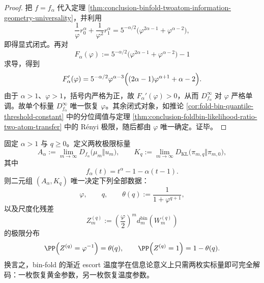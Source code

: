 \begin{proof}
把 \(f=f_\alpha\) 代入定理 \ref{thm:conclusion-binfold-twoatom-information-geometry-universality}，并利用
\[
\frac1\varphi r_0^\alpha+\frac1{\varphi^2}r_1^\alpha
=
5^{-\alpha/2}\bigl(\varphi^{2\alpha-1}+\varphi^{\alpha-2}\bigr),
\]
即得显式闭式。再对
\[
F_\alpha(\varphi):=5^{-\alpha/2}\bigl(\varphi^{2\alpha-1}+\varphi^{\alpha-2}\bigr)-1
\]
求导，得到
\[
F_\alpha'(\varphi)
=
5^{-\alpha/2}\varphi^{\alpha-3}
\Bigl((2\alpha-1)\varphi^{\alpha+1}+\alpha-2\Bigr).
\]
由于 \(\alpha>1\)、\(\varphi>1\)，括号内严格为正，故 \(F_\alpha'(\varphi)>0\)，从而 \(D_{f_\alpha}^\infty\) 对 \(\varphi\) 严格单调。故单个标量 \(D_{f_\alpha}^\infty\) 唯一恢复 \(\varphi\)。其余闭式对象，如推论 \ref{cor:fold-bin-quantile-threshold-constant} 中的分位阈值与定理 \ref{thm:conclusion-foldbin-likelihood-ratio-two-atom-transfer} 中的 Rényi 极限，随后都由 \(\varphi\) 唯一确定。证毕。
\end{proof}

\begin{theorem}\label{thm:conclusion-binfold-two-scalar-complete-reconstruction}
固定 \(\alpha>1\) 与 \(q\ge 0\)。定义两枚极限标量
\[
A_\alpha:=\lim_{m\to\infty}D_{f_\alpha}\!\bigl(\mu_m\Vert u_m\bigr),
\qquad
K_q:=\lim_{m\to\infty}D_{\mathrm{KL}}\!\bigl(\pi_{m,q}\Vert \pi_{m,0}\bigr),
\]
其中
\[
f_\alpha(t)=t^\alpha-1-\alpha(t-1).
\]
则二元组 \((A_\alpha,K_q)\) 唯一决定下列全部数据：
\[
\varphi,
\qquad
q,
\qquad
\theta(q):=\frac{1}{1+\varphi^{q+1}},
\]
以及尺度化残差
\[
Z_m^{(q)}:=\left(\frac{\varphi}{2}\right)^m d_m^{\mathrm{bin}}(W_m^{(q)})
\]
的极限分布
\[
\PP\!\left(Z^{(q)}=\varphi^{-1}\right)=\theta(q),
\qquad
\PP\!\left(Z^{(q)}=1\right)=1-\theta(q).
\]
换言之，bin-fold 的渐近 escort 温度学在信息论意义上只需两枚实标量即可完全解码：一枚恢复黄金参数，另一枚恢复温度参数。
\end{theorem}

